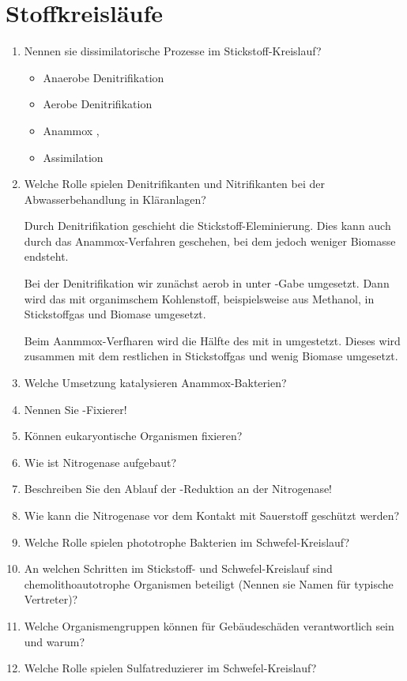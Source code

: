 
\section{Stoffkreisläufe}
\begin{enumerate}
	\item Nennen sie dissimilatorische Prozesse im Stickstoff-Kreislauf?
		
		\begin{itemize}
			\item Anaerobe Denitrifikation \hfill {} \textrightarrow {} \textrightarrow {}
			\item Aerobe Denitrifikation \hfill {} \textrightarrow {} \textrightarrow {}
			\item Anammox \hfill {}, \textrightarrow {}
			\item Assimilation \hfill {} \textrightarrow {}
		\end{itemize}

	\item Welche Rolle spielen Denitrifikanten und Nitrifikanten bei der Abwasserbehandlung in Kläranlagen?

		Durch Denitrifikation geschieht die Stickstoff-Eleminierung.
		Dies kann auch durch das Anammox-Verfahren geschehen,
		bei dem jedoch weniger Biomasse endsteht.

		Bei der Denitrifikation wir zunächst aerob  in  unter -Gabe umgesetzt.
		Dann wird das  mit organimschem Kohlenstoff,
		beispielsweise aus Methanol,
		in Stickstoffgas und Biomase umgesetzt.

		Beim Aanmmox-Verfharen wird  die Hälfte des  mit  in umgestetzt.
		Dieses wird zusammen mit dem restlichen  in Stickstoffgas und wenig Biomase umgesetzt.

	\item Welche Umsetzung katalysieren Anammox-Bakterien?
	\item Nennen Sie -Fixierer!
	\item Können eukaryontische Organismen  fixieren?
	\item Wie ist Nitrogenase aufgebaut?
	\item Beschreiben Sie den Ablauf der -Reduktion an der Nitrogenase!
	\item Wie kann die Nitrogenase vor dem Kontakt mit Sauerstoff geschützt werden?
	\item Welche Rolle spielen phototrophe Bakterien im Schwefel-Kreislauf?
	\item An welchen Schritten im Stickstoff- und Schwefel-Kreislauf sind chemolithoautotrophe Organismen beteiligt (Nennen sie Namen für typische Vertreter)?
	\item Welche Organismengruppen können für Gebäudeschäden verantwortlich sein und warum?
	\item Welche Rolle spielen Sulfatreduzierer im Schwefel-Kreislauf?
\end{enumerate}

